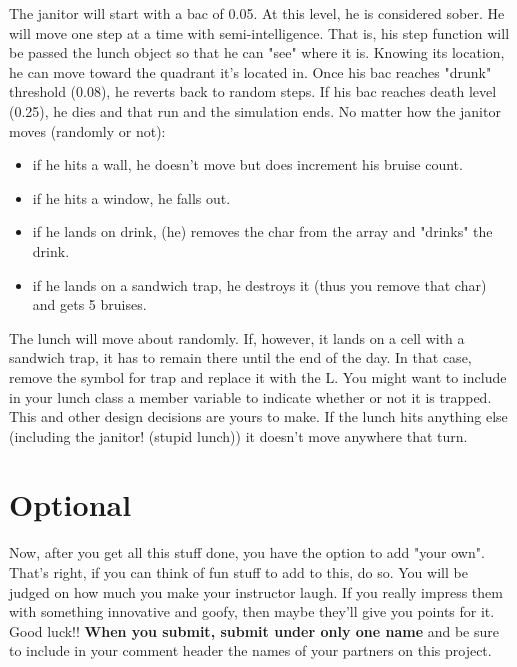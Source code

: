 \documentclass[
    subject = {{Comp Sci}},
    course = {{1570}},
    section = {{101}},
    assignment = {{Assignment 10 \\ Final Project}},
    name = {{Student One ; Student Two}},
    email = {{stosid@mst.edu ; sttsid@mst.edu}}
]{eey-homework}
\begin{document}
The janitor will start with a bac of 0.05.
At this level, he is considered sober.
He will move one step at a time with semi-intelligence.
That is, his step function will be passed the lunch object so that he can "see" where it is.
Knowing its location, he can move toward the quadrant it's located in.
Once his bac reaches "drunk" threshold (0.08), he reverts back to random steps.
If his bac reaches death level (0.25), he dies and that run and the simulation ends.
No matter how the janitor moves (randomly or not):

\begin{itemize}
    \item if he hits a wall, he doesn't move but does increment his bruise count.
    \item if he hits a window, he falls out.
    \item if he lands on drink, (he) removes the char from the array and "drinks" the drink.
    \item if he lands on a sandwich trap, he destroys it (thus you remove that char) and gets 5 bruises.
\end{itemize}

The lunch will move about randomly.
If, however, it lands on a cell with a sandwich trap, it has to remain there until the end of the day.
In that case, remove the symbol for trap and replace it with the L.
You might want to include in your lunch class a member variable to indicate whether or not it is trapped.
This and other design decisions are yours to make.
If the lunch hits anything else (including the janitor! (stupid lunch)) it doesn't move anywhere that turn.

\section{Optional}
Now, after you get all this stuff done, you have the option to add "your own".
That's right, if you can think of fun stuff to add to this, do so.
You will be judged on how much you make your instructor laugh.
If you really impress them with something innovative and goofy, then maybe they'll give you points for it.
Good luck!!\hfill\break
\textbf{When you submit, submit under only one name} and be sure to include in your comment header the names of your partners on this project.
\end{document}
